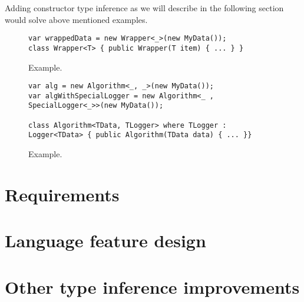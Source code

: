 Adding constructor type inference as we will describe in the following section would solve above mentioned examples.
\begin{figure}[h]
\begin{lstlisting}[style=csharp]
var wrappedData = new Wrapper<_>(new MyData());
class Wrapper<T> { public Wrapper(T item) { ... } }
\end{lstlisting}
\caption{Example.}
\label{img34}
\end{figure}
\begin{figure}[h]
\begin{lstlisting}[style=csharp]
var alg = new Algorithm<_, _>(new MyData());
var algWithSpecialLogger = new Algorithm<_ , SpecialLogger<_>>(new MyData());

class Algorithm<TData, TLogger> where TLogger : Logger<TData> { public Algorithm(TData data) { ... }}
\end{lstlisting}
\caption{Example.}
\label{img35}
\end{figure}


\section{Requirements}

\section{Language feature design}


\section{Other type inference improvements}



